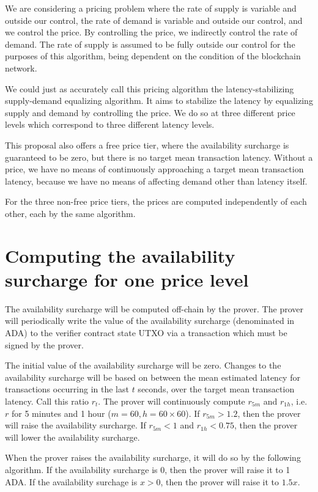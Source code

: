 \documentclass[12pt]{article}
\begin{document}
We are considering a pricing problem where the rate of supply is variable and outside our control, the rate of demand is variable and outside our control, and we control the price. By controlling the price, we indirectly control the rate of demand. The rate of supply is assumed to be fully outside our control for the purposes of this algorithm, being dependent on the condition of the blockchain network.

We could just as accurately call this pricing algorithm the latency-stabilizing supply-demand equalizing algorithm. It aims to stabilize the latency by equalizing supply and demand by controlling the price. We do so at three different price levels which correspond to three different latency levels.

This proposal also offers a free price tier, where the availability surcharge is guaranteed to be zero, but there is no target mean transaction latency. Without a price, we have no means of continuously approaching a target mean transaction latency, because we have no means of affecting demand other than latency itself.

For the three non-free price tiers, the prices are computed independently of each other, each by the same algorithm.

\section{Computing the availability surcharge for one price level}

The availability surcharge will be computed off-chain by the prover. The prover will periodically write the value of the availability surcharge (denominated in ADA) to the verifier contract state UTXO via a transaction which must be signed by the prover.

The initial value of the availability surcharge will be zero. Changes to the availability surcharge will be based on between the mean estimated latency for transactions occurring in the last $t$ seconds, over the target mean transaction latency. Call this ratio $r_t$. The prover will continuously compute $r_{5m}$ and $r_{1h}$, i.e. $r$ for 5 minutes and 1 hour ($m = 60, h = 60 \times 60$). If $r_{5m} > 1.2$, then the prover will raise the availability surcharge. If $r_{5m} < 1$ and $r_{1h} < 0.75$, then the prover will lower the availability surcharge.

When the prover raises the availability surcharge, it will do so by the following algorithm. If the availability surcharge is 0, then the prover will raise it to 1 ADA. If the availability surchage is $x > 0$, then the prover will raise it to $1.5x$.
\end{document}
